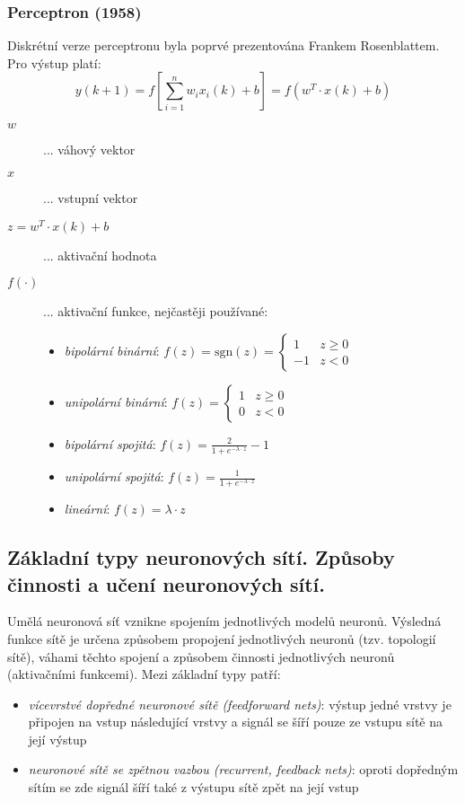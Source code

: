 \subsubsection*{Perceptron (1958)}
Diskrétní verze perceptronu byla poprvé prezentována Frankem Rosenblattem. Pro výstup platí:
\begin{equation}
y(k+1) = f\left[ \displaystyle{\sum_{i=1}^n} w_i x_i(k) + b \right] = f(w^T \cdot x(k) + b)
\end{equation}
\begin{description}
\item[$ w $] ... váhový vektor
\item[$ x $] ... vstupní vektor
\item[$ z = w^T \cdot x(k) + b $] ... aktivační hodnota
\item[$ f(\cdot) $] ... aktivační funkce, nejčastěji používané:
\begin{itemize}
\item \textit{bipolární binární}: $ f(z) = \mathrm{sgn}(z) = \begin{cases} 1 & z \geq 0 \\ -1 & z < 0 \end{cases} $
\item \textit{unipolární binární}: $ f(z) = \begin{cases} 1 & z \geq 0 \\ 0 & z < 0 \end{cases} $ 
\item \textit{bipolární spojitá}: $ f(z) = \frac{2}{1 + e^{-\lambda \cdot z}}-1 $
\item \textit{unipolární spojitá}: $ f(z) = \frac{1}{1 + e^{-\lambda \cdot z}} $
\item \textit{lineární}: $ f(z) = \lambda \cdot z $
\end{itemize}
\end{description}

\subsection{Základní typy neuronových sítí. Způsoby činnosti a učení neuronových sítí.}
Umělá neuronová síť vznikne spojením jednotlivých modelů neuronů. Výsledná funkce sítě je určena způsobem propojení jednotlivých neuronů (tzv. topologií sítě), váhami těchto spojení a způsobem činnosti jednotlivých neuronů (aktivačními funkcemi). Mezi základní typy patří:
\begin{itemize}
\item \textit{vícevrstvé dopředné neuronové sítě (feedforward nets)}: výstup jedné vrstvy je připojen na vstup následující vrstvy a signál se šíří pouze ze vstupu sítě na její výstup
\item \textit{neuronové sítě se zpětnou vazbou (recurrent, feedback nets)}: oproti dopředným sítím se zde signál šíří také z výstupu sítě zpět na její vstup
\end{itemize}

